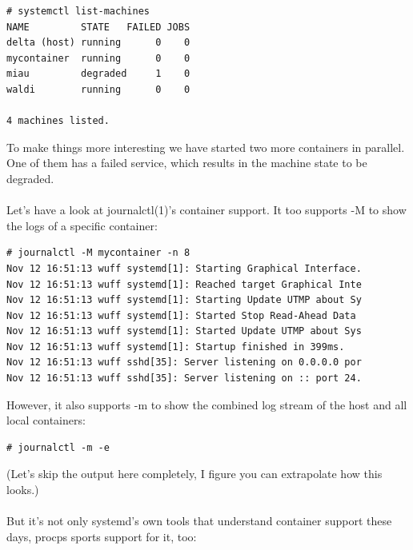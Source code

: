 \documentclass[titlepage]{article}
\begin{document}
\begin{lstlisting}
# systemctl list-machines
NAME         STATE   FAILED JOBS
delta (host) running      0    0
mycontainer  running      0    0
miau         degraded     1    0
waldi        running      0    0

4 machines listed.
\end{lstlisting}
To make things more interesting we have started two more containers in parallel. One of them has a failed service, which results in the machine state to be degraded.
\\
\\
Let's have a look at journalctl(1)'s container support. It too supports -M to show the logs of a specific container:
\begin{lstlisting}
# journalctl -M mycontainer -n 8
Nov 12 16:51:13 wuff systemd[1]: Starting Graphical Interface.
Nov 12 16:51:13 wuff systemd[1]: Reached target Graphical Inte
Nov 12 16:51:13 wuff systemd[1]: Starting Update UTMP about Sy
Nov 12 16:51:13 wuff systemd[1]: Started Stop Read-Ahead Data 
Nov 12 16:51:13 wuff systemd[1]: Started Update UTMP about Sys
Nov 12 16:51:13 wuff systemd[1]: Startup finished in 399ms.
Nov 12 16:51:13 wuff sshd[35]: Server listening on 0.0.0.0 por
Nov 12 16:51:13 wuff sshd[35]: Server listening on :: port 24.
\end{lstlisting}
However, it also supports -m to show the combined log stream of the host and all local containers:
\begin{lstlisting}
# journalctl -m -e
\end{lstlisting}
(Let's skip the output here completely, I figure you can extrapolate how this looks.)
\\
\\
But it's not only systemd's own tools that understand container support these days, procps sports support for it, too:
\end{document}
